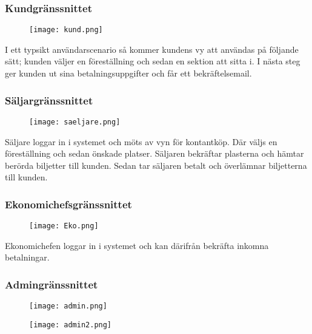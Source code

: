 \documentclass[a4paper, twoside, 11pt, titlepage]{article}
\begin{document}
		\subsubsection{Kundgränssnittet}


		\begin{figure}[ht] \centering \texttt{[image: kund.png]} \end{figure} \FloatBarrier

		I ett typsikt användarscenario så kommer kundens vy att användas på följande sätt; kunden väljer en föreställning och sedan en sektion att sitta i. I nästa steg ger kunden ut sina betalningsuppgifter och får ett bekräftelsemail.

		\subsubsection{Säljargränssnittet}


		\begin{figure}[ht] \centering \texttt{[image: saeljare.png]} \end{figure} \FloatBarrier

		Säljare loggar in i systemet och möts av vyn för kontantköp. Där väljs en föreställning och sedan önskade platser. Säljaren bekräftar plasterna och hämtar berörda biljetter till kunden. Sedan tar säljaren betalt och överlämnar biljetterna till kunden.

		\subsubsection{Ekonomichefsgränssnittet}


		\begin{figure}[ht] \centering \texttt{[image: Eko.png]} \end{figure} \FloatBarrier

		Ekonomichefen loggar in i systemet och kan därifrån bekräfta inkomna betalningar.

		\subsubsection{Admingränssnittet}


		\begin{figure}[ht] \centering \texttt{[image: admin.png]} \end{figure} \FloatBarrier

		\begin{figure}[ht] \centering \texttt{[image: admin2.png]} \end{figure} \FloatBarrier
\end{document}
